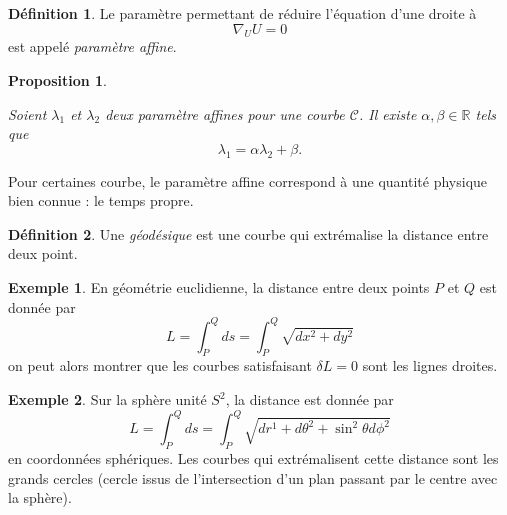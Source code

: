 \documentclass[a4paper,11pt]{report}
\theoremstyle{definition}
\theoremstyle{plain}
\newtheorem{prop}[thm]{Proposition}
\theoremstyle{definition}
\newtheorem{defn}{Définition}[chapter]
\newtheorem{exmp}{Exemple}[chapter]
\theoremstyle{remark}
\begin{document}
            \begin{defn}
                Le paramètre permettant de réduire l'équation d'une droite à 
                \begin{equation}
                    \nabla_U U = 0
                \end{equation}
                est appelé \textit{paramètre affine}.
            \end{defn}
            
            \begin{prop}\begin{leftbar}
                Soient $\lambda_1$ et $\lambda_2$ deux paramètre affines pour une courbe $\mathscr{C}$. Il existe $\alpha,\beta\in\mathbb{R}$ tels que
                \begin{equation}
                    \lambda_1 = \alpha\lambda_2+\beta.
                \end{equation}
            \end{leftbar}\end{prop}
            
            Pour certaines courbe, le paramètre affine correspond à une quantité physique bien connue : le temps propre.
            
            \begin{defn}
                Une \textit{géodésique} est une courbe qui extrémalise la distance entre deux point.
            \end{defn}
            
            \begin{exmp}
                En géométrie euclidienne, la distance entre deux points $P$ et $Q$ est donnée par 
                \begin{equation}
                    L = \int_P^Q ds = \int_P^Q \sqrt{dx^2+dy^2}
                \end{equation}
                on peut alors montrer que les courbes satisfaisant $\delta L = 0$ sont les lignes droites.
            \end{exmp}
            
            \begin{exmp}
                Sur la sphère unité $S^2$, la distance est donnée par
                \begin{equation}
                    L = \int_P^Qds = \int_P^Q\sqrt{dr^1+d\theta^2+\sin^2\theta d\phi^2}
                \end{equation}
                en coordonnées sphériques. Les courbes qui extrémalisent cette distance sont les grands cercles (cercle issus de l'intersection d'un plan passant par le centre avec la sphère).
            \end{exmp}
            
\end{document}
